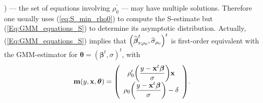 ) --- the set of equations involving $\rho_{0}^{\prime}$ --- may have multiple
solutions. Therefore one usually uses (\ref{eq:S_min_rho0}) to compute the
S-estimate but (\ref{Eq:GMM_equations_S}) to determine its asymptotic
distribution. Actually, (\ref{Eq:GMM_equations_S}) implies that $\left(
\sthat{\boldsymbol\beta}_{\stsc{S};\rho_{0}}^{t},\sthat{\sigma}%
_{\rho_{0}}\right)  ^{t}$ is first-order equivalent with the GMM-estimator for
$\boldsymbol{\theta}=\left(  \boldsymbol\beta^{t},\sigma\right)  ^{t}$,
with
\[
\mathbf{m}\left(  y,\stvec{x},\boldsymbol{\theta}\right)  =\left(
\begin{array}
[c]{c}%
\rho_{0}^{\prime}\left(  \dfrac{y-\stvec{x}^{t}\boldsymbol\beta}{\sigma
}\right)  \stvec{x}\\
\rho_{0}\left(  \dfrac{y-\stvec{x}^{t}\boldsymbol\beta}{\sigma}\right)
-\delta
\end{array}
\right)  .
\]


